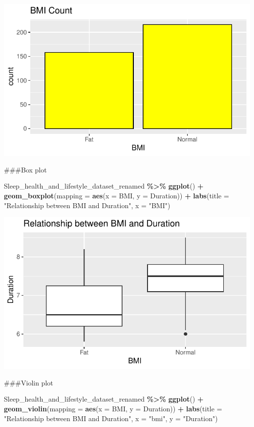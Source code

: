 \documentclass[
  11pt,
]{article}
\newenvironment{Shaded}{\begin{snugshade}}{\end{snugshade}}
\newcommand{\AttributeTok}[1]{\textcolor[rgb]{0.13,0.29,0.53}{#1}}
\newcommand{\FunctionTok}[1]{\textcolor[rgb]{0.13,0.29,0.53}{\textbf{#1}}}
\newcommand{\NormalTok}[1]{#1}
\newcommand{\SpecialCharTok}[1]{\textcolor[rgb]{0.81,0.36,0.00}{\textbf{#1}}}
\newcommand{\StringTok}[1]{\textcolor[rgb]{0.31,0.60,0.02}{#1}}
\begin{document}
\begin{center}\includegraphics[width=0.7\linewidth]{SleepHelath_files/figure-latex/unnamed-chunk-42-1} \end{center}

\#\#\#Box plot

\begin{Shaded}
\begin{Highlighting}[]
\NormalTok{Sleep\_health\_and\_lifestyle\_dataset\_renamed }\SpecialCharTok{\%\textgreater{}\%}
  \FunctionTok{ggplot}\NormalTok{() }\SpecialCharTok{+}
    \FunctionTok{geom\_boxplot}\NormalTok{(}\AttributeTok{mapping =} \FunctionTok{aes}\NormalTok{(}\AttributeTok{x =}\NormalTok{ BMI, }\AttributeTok{y =}\NormalTok{ Duration)) }\SpecialCharTok{+}
    \FunctionTok{labs}\NormalTok{(}\AttributeTok{title =} \StringTok{"Relationship between BMI and Duration"}\NormalTok{, }\AttributeTok{x =} \StringTok{"BMI"}\NormalTok{)}
\end{Highlighting}
\end{Shaded}

\begin{center}\includegraphics[width=0.7\linewidth]{SleepHelath_files/figure-latex/unnamed-chunk-43-1} \end{center}

\#\#\#Violin plot

\begin{Shaded}
\begin{Highlighting}[]
\NormalTok{Sleep\_health\_and\_lifestyle\_dataset\_renamed }\SpecialCharTok{\%\textgreater{}\%}
  \FunctionTok{ggplot}\NormalTok{() }\SpecialCharTok{+}
    \FunctionTok{geom\_violin}\NormalTok{(}\AttributeTok{mapping =} \FunctionTok{aes}\NormalTok{(}\AttributeTok{x =}\NormalTok{ BMI, }\AttributeTok{y =}\NormalTok{ Duration)) }\SpecialCharTok{+}
    \FunctionTok{labs}\NormalTok{(}\AttributeTok{title =} \StringTok{"Relationship between BMI and Duration"}\NormalTok{, }\AttributeTok{x =} \StringTok{"bmi"}\NormalTok{, }\AttributeTok{y =} \StringTok{"Duration"}\NormalTok{)}
\end{Highlighting}
\end{Shaded}
\end{document}
